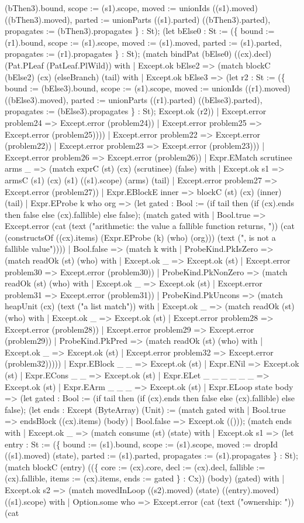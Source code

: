 \documentclass[11pt]{article}
\begin{document}
(bThen3).bound, scope := (s1).scope, moved := unionIds ((s1).moved) ((bThen3).moved), parted := unionParts ((s1).parted) ((bThen3).parted), propagates := (bThen3).propagates \} : St); (let bElse0 : St := (\{ bound := (r1).bound, scope := (s1).scope, moved := (s1).moved, parted := (s1).parted, propagates := (r1).propagates \} : St); (match bindPat (bElse0) ((cx).decl) (Pat.PLeaf (PatLeaf.PlWild)) with | Except.ok bElse2 => (match blockC (bElse2) (cx) (elseBranch) (tail) with | Except.ok bElse3 => (let r2 : St := (\{ bound := (bElse3).bound, scope := (s1).scope, moved := unionIds ((r1).moved) ((bElse3).moved), parted := unionParts ((r1).parted) ((bElse3).parted), propagates := (bElse3).propagates \} : St); Except.ok (r2)) | Except.error problem24 => Except.error (problem24)) | Except.error problem25 => Except.error (problem25)))) | Except.error problem22 => Except.error (problem22)) | Except.error problem23 => Except.error (problem23))) | Except.error problem26 => Except.error (problem26)) | Expr.EMatch scrutinee arms \_ => (match exprC (st) (cx) (scrutinee) (false) with | Except.ok s1 => armsC (s1) (cx) (s1) ((s1).scope) (arms) (tail) | Except.error problem27 => Except.error (problem27)) | Expr.EBlockE inner => blockC (st) (cx) (inner) (tail) | Expr.EProbe k who org => (let gated : Bool := (if tail then (if (cx).ends then false else (cx).fallible) else false); (match gated with | Bool.true => Except.error (cat (text ("arithmetic: the value a fallible function returns, ")) (cat (constructsOf ((cx).items) (Expr.EProbe (k) (who) (org))) (text (", is not a fallible value")))) | Bool.false => (match k with | ProbeKind.PkIsZero => (match readOk (st) (who) with | Except.ok \_ => Except.ok (st) | Except.error problem30 => Except.error (problem30)) | ProbeKind.PkNonZero => (match readOk (st) (who) with | Except.ok \_ => Except.ok (st) | Except.error problem31 => Except.error (problem31)) | ProbeKind.PkUncons => (match heapUnit (cx) (text ("a list match")) with | Except.ok \_ => (match readOk (st) (who) with | Except.ok \_ => Except.ok (st) | Except.error problem28 => Except.error (problem28)) | Except.error problem29 => Except.error (problem29)) | ProbeKind.PkPred => (match readOk (st) (who) with | Except.ok \_ => Except.ok (st) | Except.error problem32 => Except.error (problem32))))) | Expr.EBlock \_ \_ => Except.ok (st) | Expr.ENil => Except.ok (st) | Expr.ECons \_ \_ => Except.ok (st) | Expr.ELet \_ \_ \_ \_ \_ \_ => Except.ok (st) | Expr.EArm \_ \_ \_ => Except.ok (st) | Expr.ELoop state body => (let gated : Bool := (if tail then (if (cx).ends then false else (cx).fallible) else false); (let ends : Except (ByteArray) (Unit) := (match gated with | Bool.true => endsBlock ((cx).items) (body) | Bool.false => Except.ok (())); (match ends with | Except.ok \_ => (match consume (st) (state) with | Except.ok s1 => (let entry : St := (\{ bound := (s1).bound, scope := (s1).scope, moved := dropId ((s1).moved) (state), parted := (s1).parted, propagates := (s1).propagates \} : St); (match blockC (entry) ((\{ core := (cx).core, decl := (cx).decl, fallible := (cx).fallible, items := (cx).items, ends := gated \} : Cx)) (body) (gated) with | Except.ok s2 => (match movedInLoop ((s2).moved) (state) ((entry).moved) ((s1).scope) with | Option.some who => Except.error (cat (text ("ownership: ")) (cat 
\end{document}
